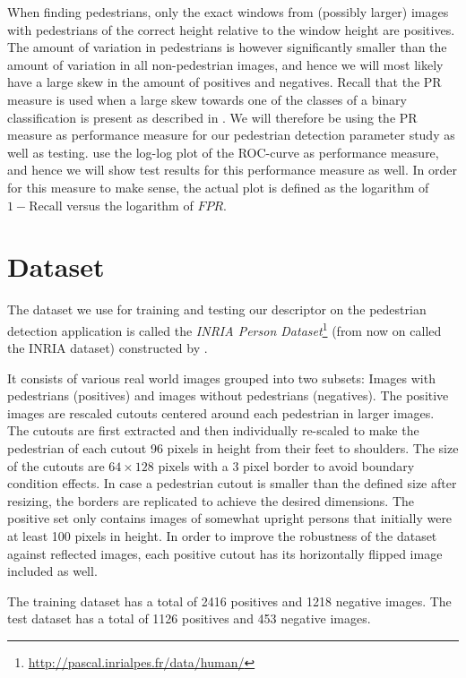 \documentclass[thesis.tex]{subfiles}
\begin{document}
When finding pedestrians, only the exact windows from (possibly larger) images with pedestrians of the correct height relative to the window height are positives. The amount of variation in pedestrians is however significantly smaller than the amount of variation in all non-pedestrian images, and hence we will most likely have a large skew in the amount of positives and negatives.
Recall that the PR measure is used when a large skew towards one of the classes of a binary classification is present as described in . We will therefore be using the PR measure as performance measure for our pedestrian detection parameter study as well as testing.  use the log-log plot of the ROC-curve as performance measure, and hence we will show test results for this performance measure as well. In order for this measure to make sense, the actual plot is defined as the logarithm of $1-\text{Recall}$ versus the logarithm of $FPR$.

\section{Dataset}
\label{sec:odDataset}

The dataset we use for training and testing our descriptor on the pedestrian detection application is called the \emph{INRIA Person Dataset}\footnote{\url{http://pascal.inrialpes.fr/data/human/}} (from now on called the INRIA dataset) constructed by \citet{dalal2005histograms}.

It consists of various real world images grouped into two subsets: Images with pedestrians (positives) and images without pedestrians (negatives). The positive images are rescaled cutouts centered around each pedestrian in larger images. The cutouts are first extracted and then individually re-scaled to make the pedestrian of each cutout 96 pixels in height from their feet to shoulders. The size of the cutouts are $64 \times 128$ pixels with a 3 pixel border to avoid boundary condition effects. In case a pedestrian cutout is smaller than the defined size after resizing, the borders are replicated to achieve the desired dimensions.
The positive set only contains images of somewhat upright persons that initially were at least 100 pixels in height. In order to improve the robustness of the dataset against reflected images, each positive cutout has its horizontally flipped image included as well.

The training dataset has a total of 2416 positives and 1218 negative images.
The test dataset has a total of 1126 positives and 453 negative images.
\end{document}
